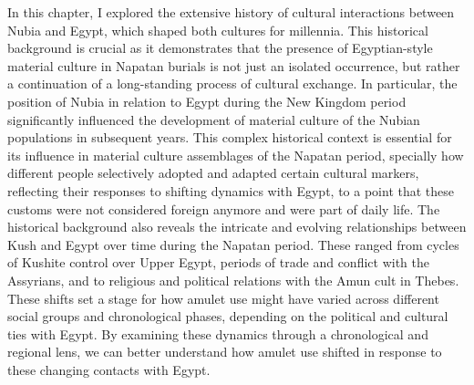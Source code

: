 In this chapter, I explored the extensive history of cultural interactions between Nubia and Egypt, which shaped both cultures for millennia. This historical background is crucial as it demonstrates that the presence of Egyptian-style material culture in Napatan burials is not just an isolated occurrence, but rather a continuation of a long-standing process of cultural exchange. In particular, the position of Nubia in relation to Egypt during the New Kingdom period significantly influenced the development of material culture of the Nubian populations in subsequent years. This complex historical context is essential for its influence in material culture assemblages of the Napatan period, specially how different people selectively adopted and adapted certain cultural markers, reflecting their responses to shifting dynamics with Egypt, to a point that these customs were not considered foreign anymore and were part of daily life. The historical background also reveals the intricate and evolving relationships between Kush and Egypt over time during the Napatan period. These ranged from cycles of Kushite control over Upper Egypt, periods of trade and conflict with the Assyrians, and to religious and political relations with the Amun cult in Thebes. These shifts set a stage for how amulet use might have varied across different social groups and chronological phases, depending on the political and cultural ties with Egypt. By examining these dynamics through a chronological and regional lens, we can better understand how amulet use shifted in response to these changing contacts with Egypt.
